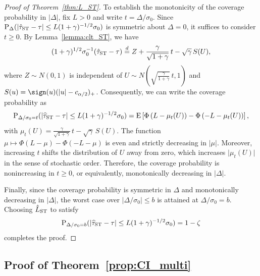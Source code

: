 \documentclass[11pt]{article}
\def\P{{\mathrm P}}
\def\E{{\mathrm E}}
\newcommand{\htau}{\widehat\tau}
\numberwithin{equation}{section}
\theoremstyle{definition}
\begin{document}
\begin{proof}[Proof of Theorem~\ref{thm:L_ST}]
To establish the monotonicity of the coverage probability in $\lvert \Delta \rvert$, fix $L>0$ and write $t=\Delta/\sigma_0$. 
Since $\P_{\Delta}(\lvert \hat\tau_{\rm ST}-\tau\rvert\le L(1+\gamma)^{-1/2}\sigma_0)$
is symmetric about $\Delta = 0$, it suffices to consider $t\ge0$. By Lemma~\ref{lemma:clt_ST}, we have
\[
(1+\gamma)^{1/2}\sigma_0^{-1}(\hat\tau_{\rm ST}-\tau)
\stackrel{d}{=}
Z + \frac{\gamma}{\sqrt{1+\gamma}}\,t
- \sqrt{\gamma}\,S(U),
\]
where $Z\sim N(0,1)$ is independent of
$U\sim N(\sqrt{\frac{\gamma}{1+\gamma}}\,t,1)$ and
$S(u)=\sign(u)(|u|-c_{\alpha/2})_+$.
Consequently, we can write the coverage probability as
\[
  \P_{\Delta/\sigma_0 = t}(\lvert \htau_{\rm ST} - \tau \rvert \le L (1+\gamma)^{-1/2} \sigma_0) = \E\left[
\Phi\left(L-\mu_t(U)\right)
-\Phi\left(-L-\mu_t(U)\right)
\right],
\]
with $\mu_t(U)=\frac{\gamma}{\sqrt{1+\gamma}}\,t-\sqrt{\gamma}\,S(U)$. The function $\mu\mapsto\Phi(L-\mu)-\Phi(-L-\mu)$ is even and strictly
decreasing in $\lvert \mu \rvert$. Moreover, increasing $t$ shifts the distribution of $U$ away from zero,
which increases $\lvert \mu_t(U) \rvert$ in the sense of stochastic order.
Therefore, the coverage probability
is nonincreasing in $t\ge0$, or equivalently, monotonically decreasing in $\lvert \Delta\rvert$.

Finally, since the coverage probability is symmetric in $\Delta$ and monotonically decreasing in $\lvert \Delta \rvert$, the worst case over
$\lvert \Delta/\sigma_0\rvert\le b$ is attained at $\Delta/\sigma_0 = b$. Choosing $\hat L_{\rm ST}$ to satisfy
\[
  \P_{\Delta/\sigma_0 = b}(\lvert \htau_{\rm ST}- \tau \rvert \le L (1+\gamma)^{-1/2} \sigma_0) = 1-\zeta
\]
completes the proof.

\end{proof}

\subsection{Proof of Theorem~\ref{prop:CI_multi}}
\end{document}

